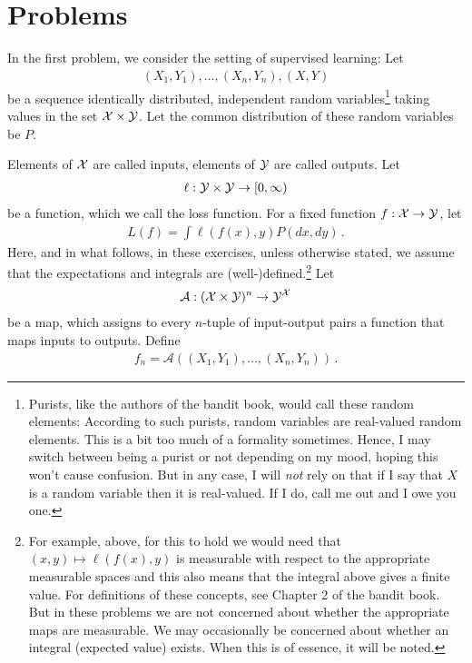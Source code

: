 \documentclass{article}
\DeclareMathOperator*{\1}{\mathbbm{1}}
\theoremstyle{definition}
\theoremstyle{remark}
\newcommand{\cA}{\mathcal{A}}
\begin{document}
\section*{Problems}


In the first problem, we consider the setting of supervised learning:
Let
\begin{align*}
(X_1,Y_1),\dots,(X_n,Y_n),(X,Y)
\end{align*}
be a sequence identically distributed, independent random variables\footnote{Purists, like the authors of the bandit book, would call these random elements: According to such purists, random variables are real-valued random elements. This is a bit too much of a formality sometimes. Hence, I may switch between being a purist or not depending on my mood, hoping this won't cause confusion. But in any case, I will \emph{not} rely on that if I say that $X$ is a random variable then it is real-valued. If I do, call me out and I owe you one.
}
 taking values in the set $\mathcal{X} \times \mathcal{Y}$.
Let the common distribution of these random variables be $P$.

Elements of $\mathcal{X}$ are called inputs, elements of $\mathcal{Y}$ are called outputs.
Let 
\begin{align*}
\ell:\mathcal{Y} \times \mathcal{Y} \to [0,\infty)
\end{align*}
be a function, which we call the loss function.
For a fixed function $f:\mathcal{X} \to \mathcal{Y}$, let 
\begin{align}
L(f) = \int \ell(f(x),y) P(dx,dy)\,. 
\label{eq:Ldef}
\end{align}
Here, and in what follows, in these exercises, unless otherwise stated, we assume that the expectations and integrals are (well-)defined.\footnote{For example, above, for this to hold we would need that $(x,y) \mapsto \ell(f(x),y)$ is measurable with respect to the appropriate measurable spaces and this also means that the integral above gives a finite value. For definitions of these concepts, see Chapter 2 of the bandit book.
But in these problems we are not concerned about whether the appropriate maps are measurable. We may occasionally be concerned about whether an integral  (expected value) exists. When this is of essence, it will be noted.
}
Let 
\begin{align*}
\cA: (\cX\times \cY)^n \to \cY^{\cX}
\end{align*}
be a map, which assigns to every $n$-tuple of input-output pairs a function that maps inputs to outputs. 
Define
\begin{align*}
f_n = \cA( (X_1,Y_1),\dots, (X_n,Y_n) )\,.
\end{align*}
\end{document}
